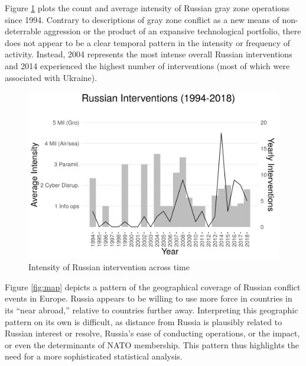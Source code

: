 \documentclass[bibtex, autowc]{apsr_submission}
\begin{document}
Figure \ref{fig:intensity} plots the count and average intensity of Russian gray zone operations since 1994. Contrary to descriptions of gray zone conflict as a new means of non-deterrable aggression or the product of an expansive technological portfolio, there does not appear to be a clear temporal pattern in the intensity or frequency of activity. Instead, 2004 represents the most intense overall Russian interventions and 2014 experienced the highest number of interventions (most of which were associated with Ukraine).

    \begin{figure}[H]
		\centering
		\includegraphics[width = \textwidth]{average_intensity_russian_aggression.png}
		\caption{Intensity of Russian intervention across time}
    \label{fig:intensity}
    \end{figure}

Figure \ref{fig:map} depicts a pattern of the geographical coverage of Russian conflict events in Europe. Russia appears to be willing to use more force in countries in its ``near abroad,'' relative to countries further away. Interpreting this geographic pattern on its own is difficult, as distance from Russia is plausibly related to Russian interest or resolve, Russia's ease of conducting operations, or the impact, or even the determinants of NATO membership. This pattern thus  highlights the need for a more sophisticated statistical analysis.
\end{document}
